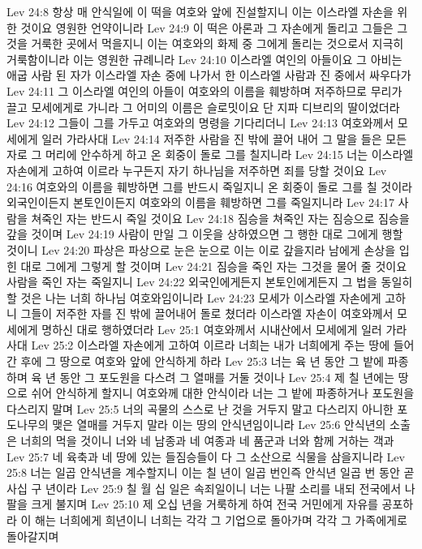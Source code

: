 Lev 24:8  항상 매 안식일에 이 떡을 여호와 앞에 진설할지니 이는 이스라엘 자손을 위한 것이요 영원한 언약이니라
Lev 24:9  이 떡은 아론과 그 자손에게 돌리고 그들은 그것을 거룩한 곳에서 먹을지니 이는 여호와의 화제 중 그에게 돌리는 것으로서 지극히 거룩함이니라 이는 영원한 규례니라
Lev 24:10  이스라엘 여인의 아들이요 그 아비는 애굽 사람 된 자가 이스라엘 자손 중에 나가서 한 이스라엘 사람과 진 중에서 싸우다가
Lev 24:11  그 이스라엘 여인의 아들이 여호와의 이름을 훼방하며 저주하므로 무리가 끌고 모세에게로 가니라 그 어미의 이름은 슬로밋이요 단 지파 디브리의 딸이었더라
Lev 24:12  그들이 그를 가두고 여호와의 명령을 기다리더니
Lev 24:13  여호와께서 모세에게 일러 가라사대
Lev 24:14  저주한 사람을 진 밖에 끌어 내어 그 말을 들은 모든 자로 그 머리에 안수하게 하고 온 회중이 돌로 그를 칠지니라
Lev 24:15  너는 이스라엘 자손에게 고하여 이르라 누구든지 자기 하나님을 저주하면 죄를 당할 것이요
Lev 24:16  여호와의 이름을 훼방하면 그를 반드시 죽일지니 온 회중이 돌로 그를 칠 것이라 외국인이든지 본토인이든지 여호와의 이름을 훼방하면 그를 죽일지니라
Lev 24:17  사람을 쳐죽인 자는 반드시 죽일 것이요
Lev 24:18  짐승을 쳐죽인 자는 짐승으로 짐승을 갚을 것이며
Lev 24:19  사람이 만일 그 이웃을 상하였으면 그 행한 대로 그에게 행할 것이니
Lev 24:20  파상은 파상으로 눈은 눈으로 이는 이로 갚을지라 남에게 손상을 입힌 대로 그에게 그렇게 할 것이며
Lev 24:21  짐승을 죽인 자는 그것을 물어 줄 것이요 사람을 죽인 자는 죽일지니
Lev 24:22  외국인에게든지 본토인에게든지 그 법을 동일히 할 것은 나는 너희 하나님 여호와임이니라
Lev 24:23  모세가 이스라엘 자손에게 고하니 그들이 저주한 자를 진 밖에 끌어내어 돌로 쳤더라 이스라엘 자손이 여호와께서 모세에게 명하신 대로 행하였더라
Lev 25:1  여호와께서 시내산에서 모세에게 일러 가라사대
Lev 25:2  이스라엘 자손에게 고하여 이르라 너희는 내가 너희에게 주는 땅에 들어간 후에 그 땅으로 여호와 앞에 안식하게 하라
Lev 25:3  너는 육 년 동안 그 밭에 파종하며 육 년 동안 그 포도원을 다스려 그 열매를 거둘 것이나
Lev 25:4  제 칠 년에는 땅으로 쉬어 안식하게 할지니 여호와께 대한 안식이라 너는 그 밭에 파종하거나 포도원을 다스리지 말며
Lev 25:5  너의 곡물의 스스로 난 것을 거두지 말고 다스리지 아니한 포도나무의 맺은 열매를 거두지 말라 이는 땅의 안식년임이니라
Lev 25:6  안식년의 소출은 너희의 먹을 것이니 너와 네 남종과 네 여종과 네 품군과 너와 함께 거하는 객과
Lev 25:7  네 육축과 네 땅에 있는 들짐승들이 다 그 소산으로 식물을 삼을지니라
Lev 25:8  너는 일곱 안식년을 계수할지니 이는 칠 년이 일곱 번인즉 안식년 일곱 번 동안 곧 사십 구 년이라
Lev 25:9  칠 월 십 일은 속죄일이니 너는 나팔 소리를 내되 전국에서 나팔을 크게 불지며
Lev 25:10  제 오십 년을 거룩하게 하여 전국 거민에게 자유를 공포하라 이 해는 너희에게 희년이니 너희는 각각 그 기업으로 돌아가며 각각 그 가족에게로 돌아갈지며
